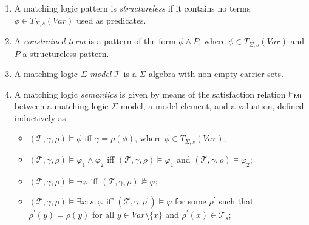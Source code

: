 \begin{definition}
\begin{enumerate}
    \item A matching logic pattern is \emph{structureless} if it contains
          no terms $\phi \in T_{\Sigma, s}(\mathit{Var})$ used as predicates.
    \item A \emph{constrained term} is a pattern of the form $\phi \land P$,
          where $\phi \in T_{\Sigma, s}(\mathit{Var})$ and $P$ a structureless pattern.
    \item A matching logic $\Sigma$-\emph{model} $\mathcal{T}$ is a $\Sigma$-algebra with non-empty carrier sets.
    \item A matching logic \emph{semantics} is given by means of
          the satisfaction relation $\vDash_{\mathsf{ML}}$ between a matching logic $\Sigma$-model,
          a model element, and a valuation,
          defined inductively as
          \begin{itemize}
              \item $(\mathcal{T}, \gamma, \rho) \vDash \phi$ iff $\gamma = \rho(\phi)$, where $\phi \in T_{\Sigma, s}(\mathit{Var})$;
              \item $(\mathcal{T}, \gamma, \rho) \vDash \varphi_1 \land \varphi_2$ iff
                $(\mathcal{T}, \gamma, \rho) \vDash \varphi_1$ and
                $(\mathcal{T}, \gamma, \rho) \vDash \varphi_2$;
              \item $(\mathcal{T}, \gamma, \rho) \vDash \neg \varphi$ iff
                $(\mathcal{T}, \gamma, \rho) \not\vDash \varphi$;
              \item $(\mathcal{T}, \gamma, \rho) \vDash \exists x : s.\, \varphi$ iff
                $(\mathcal{T}, \gamma, \rho^\prime) \vDash \varphi$ for some $\rho^\prime$ such that
                $\rho^\prime(y) = \rho(y)$ for all $y \in \mathit{Var} \setminus \{ x \}$
                and $\rho^\prime(x) \in \mathcal{T}_s$;
          \end{itemize}
          
\end{enumerate}

\end{definition}


